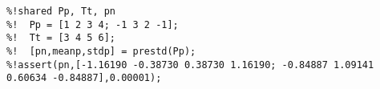 \begin{verbatim}
%!shared Pp, Tt, pn
%!  Pp = [1 2 3 4; -1 3 2 -1];
%!  Tt = [3 4 5 6];
%!  [pn,meanp,stdp] = prestd(Pp);
%!assert(pn,[-1.16190 -0.38730 0.38730 1.16190; -0.84887 1.09141 0.60634 -0.84887],0.00001);
\end{verbatim}
